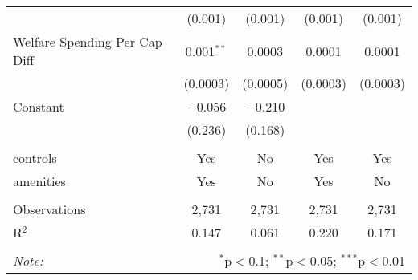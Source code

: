 \begin{table}[!htbp]
\begin{tabular}{@{\extracolsep{5pt}}lcccc}
  & (0.001) & (0.001) & (0.001) & (0.001) \\ 
  Welfare Spending Per Cap Diff & 0.001$^{**}$ & 0.0003 & 0.0001 & 0.0001 \\ 
  & (0.0003) & (0.0005) & (0.0003) & (0.0003) \\ 
  Constant & $-$0.056 & $-$0.210 &  &  \\ 
  & (0.236) & (0.168) &  &  \\ 
 \hline \\[-1.8ex] 
controls & Yes & No & Yes & Yes \\ 
amenities & Yes & No & Yes & No \\ 
\hline \\[-1.8ex] 
Observations & 2,731 & 2,731 & 2,731 & 2,731 \\ 
R$^{2}$ & 0.147 & 0.061 & 0.220 & 0.171 \\ 
\hline 
\hline \\[-1.8ex] 
\textit{Note:}  & \multicolumn{4}{r}{$^{*}$p$<$0.1; $^{**}$p$<$0.05; $^{***}$p$<$0.01} \\ 
\end{tabular} 
\end{table} 
